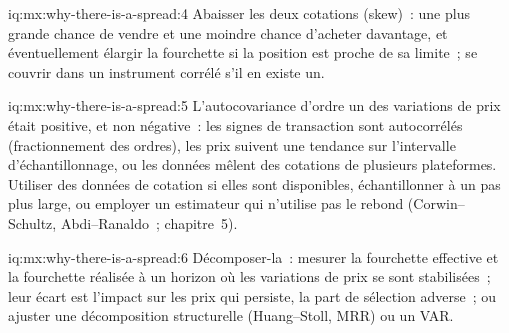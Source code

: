 \begin{solution}{iq:mx:why-there-is-a-spread:4}
Abaisser les deux cotations (skew)~: une plus grande chance de vendre et une moindre chance d'acheter davantage, et éventuellement élargir la fourchette si la position est proche de sa limite~; se couvrir dans un
instrument corrélé s'il en existe un. 
\end{solution}

\begin{solution}{iq:mx:why-there-is-a-spread:5}
L'autocovariance d'ordre un des variations de prix était positive, et non négative~: les signes de transaction sont autocorrélés (fractionnement des ordres), les prix suivent une tendance sur
l'intervalle d'échantillonnage, ou les données mêlent des cotations de plusieurs plateformes. Utiliser des données de cotation si elles sont disponibles, échantillonner à un pas plus large, ou employer un estimateur qui
n'utilise pas le rebond (Corwin--Schultz, Abdi--Ranaldo~; chapitre~5). 
\end{solution}

\begin{solution}{iq:mx:why-there-is-a-spread:6}
Décomposer-la~: mesurer la fourchette effective et la fourchette réalisée à un horizon où les variations de prix se sont stabilisées~; leur écart est l'impact sur les prix qui
persiste, la part de sélection adverse~; ou ajuster une décomposition structurelle (Huang--Stoll, MRR) ou un VAR. 
\end{solution}
